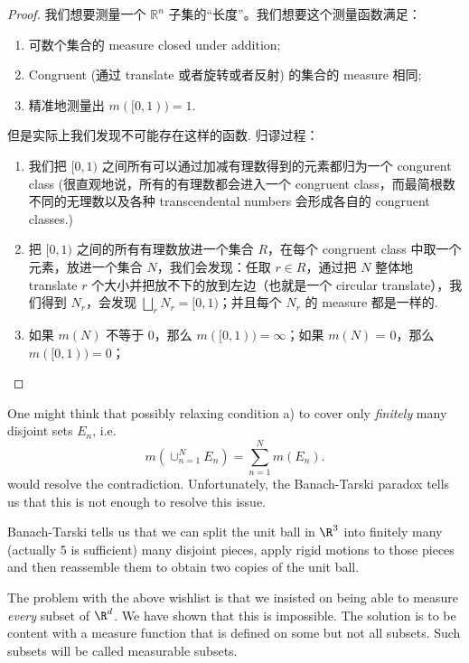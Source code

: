 \documentclass[lang=cn,11pt]{template}
\begin{document}
\begin{proof}
\noindent 我们想要测量一个 $\mathbb{R}^n$ 子集的“长度”。我们想要这个测量函数满足：

\begin{enumerate}
    \item  可数个集合的 measure closed under addition;
    \item  Congruent (通过 translate 或者旋转或者反射) 的集合的 measure 相同; 
    \item  精准地测量出 $m([0,1)) = 1$. 
\end{enumerate}


\noindent 但是实际上我们发现不可能存在这样的函数. 
\noindent 归谬过程：
   \begin{enumerate}
       \item   我们把 $[0,1)$ 之间所有可以通过加减有理数得到的元素都归为一个 congurent class (很直观地说，所有的有理数都会进入一个 congruent class，而最简根数不同的无理数以及各种 transcendental numbers 会形成各自的 congruent classes.)
       \item  把 $[0,1)$ 之间的所有有理数放进一个集合 $R$，在每个 congruent class 中取一个元素，放进一个集合 $N$，我们会发现：任取 $r \in R$，通过把 $N$ 整体地 translate $r$ 个大小并把放不下的放到左边（也就是一个 circular translate），我们得到 $N_r$，会发现 $\bigsqcup_{r} N_r = [0,1)$；并且每个 $N_r$ 的 measure 都是一样的.
       \item   如果 $m(N)$ 不等于 0，那么 $m([0,1)) = \infty$；如果 $m(N)$ = 0，那么 $m([0,1)) = 0$；
   \end{enumerate}
\end{proof}
 One might think that possibly relaxing condition a) to cover only \emph{finitely} many disjoint sets $E_n$, i.e. 
        $$
m(\cup_{n=1}^N E_n)=\sum_{n=1}^N m(E_n).
$$    
would resolve the contradiction. Unfortunately, the Banach-Tarski paradox tells us that this is not enough to resolve this issue. 

Banach-Tarski tells us that we can split the unit ball in $\R^3$ into finitely many (actually 5 is sufficient) many disjoint pieces, apply rigid motions to those pieces and then reassemble them to obtain two copies of the unit ball.

 The problem with the above wishlist is that we insisted on being able to measure \emph{every} subset of $\R^d$. We have shown that this is impossible. The solution is to be content with a measure function that is defined on some but not all subsets. Such subsets will be called measurable subsets.
\end{document}
